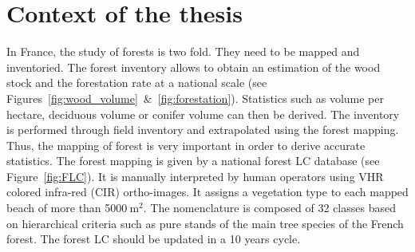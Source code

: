 \section{Context of the thesis}
In France, the study of forests is two fold. They need to be mapped and inventoried. The forest inventory allows to obtain an estimation of the wood stock and the forestation rate at a national scale (see Figures~\ref{fig:wood_volume}~\&~\ref{fig:forestation}). Statistics such as volume per hectare, deciduous volume or conifer volume can then be derived. The inventory is performed through field inventory and extrapolated using the forest mapping. Thus, the mapping of forest is very important in order to derive accurate statistics.	
The forest mapping is given by a national forest LC database (see Figure~\ref{fig:FLC}). It is manually interpreted by human operators using VHR colored infra-red (CIR) ortho-images. It assigns a vegetation type to each mapped beach of more than 5000$\:$m$^{2}$. The nomenclature is composed of 32 classes based on hierarchical criteria such as pure stands of the main tree species of the French forest. The forest LC should be updated in a 10 years cycle.

